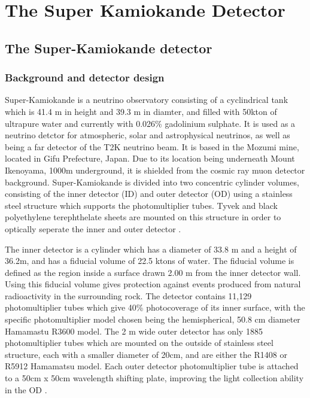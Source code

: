 \chapter{The Super Kamiokande Detector}
\label{chp:superk}



\section{The Super-Kamiokande detector}

\subsection{Background and detector design}

Super-Kamiokande is a neutrino observatory consisting of a cyclindrical tank which is 41.4 m in height and 39.3 m in diamter, and filled with 50kton of ultrapure water and currently with 0.026\% gadolinium sulphate. It is used as a neutrino detctor for atmospheric, solar and astrophysical neutrinos, as well as being a far detector of the T2K neutrino beam. It is based in the Mozumi mine, located in Gifu Prefecture, Japan. Due to its location being underneath Mount Ikenoyama, 1000m underground, it is shielded from the cosmic ray muon detector background. Super-Kamiokande is divided into two concentric cylinder volumes, consisting of the inner detector (ID) and outer detector (OD) using a stainless steel structure which supports the photomultiplier tubes. Tyvek and black polyethylene terephthelate sheets are mounted on this structure in order to optically seperate the inner and outer detector \cite{suzuki_super-kamiokande_2019}.

The inner detector is a cylinder which has a diameter of 33.8 m and a height of 36.2m, and has a fiducial volume of 22.5 ktons of water. The fiducial volume is defined as the region inside a surface drawn 2.00 m from the inner detector wall. Using this fiducial volume gives protection against events produced from natural radioactivity in the surrounding rock. The detector contains 11,129 photomultiplier tubes which give 40\% photocoverage of its inner surface, with the specific photomultiplier model chosen being the hemispherical, 50.8 cm diameter Hamamastu R3600 model. The 2 m wide outer detector has only 1885 photomultiplier tubes which are mounted on the outside of stainless steel structure, each with a smaller diameter of 20cm, and are either the R1408 or R5912 Hamamatsu model. Each outer detector photomultiplier tube is attached to a 50cm x 50cm wavelength shifting plate, improving the light collection ability in the OD \cite{fukuda_super-kamiokande_2003}.

